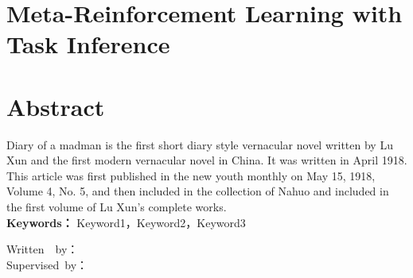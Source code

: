 
\section*{Meta-Reinforcement Learning with Task Inference}
\section*{Abstract}
Diary of a madman is the first short diary style vernacular novel written by Lu Xun and the first modern vernacular novel in China. It was written in April 1918. This article was first published in the new youth monthly on May 15, 1918, Volume 4, No. 5, and then included in the collection of Nahuo and included in the first volume of Lu Xun's complete works.
\\
\noindent\textbf{Keywords：} Keyword1，Keyword2，Keyword3

\begin{adjustwidth}{25em}{0em}
	Written\ \ by：\\
	Supervised\ by：
\end{adjustwidth}

\pagestyle{fancy}			%
\chead{}	%

